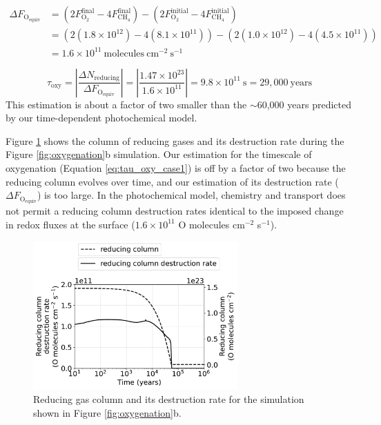 \begin{equation}
\begin{split}
\Delta F_\mathrm{O_{equiv}} &= (2 F_\mathrm{O_2}^\text{final} - 4 F_\mathrm{CH_4}^\text{final}) - (2 F_\mathrm{O_2}^\text{initial} - 4 F_\mathrm{CH_4}^\text{initial}) \\
&= (2(1.8\times10^{12}) - 4(8.1\times10^{11})) - (2(1.0\times10^{12}) - 4(4.5\times10^{11})) \\
&= 1.6 \times 10^{11} \:\mathrm{molecules}\:\mathrm{cm^{-2}}\:\mathrm{s^{-1}}
\end{split}
\end{equation}

\begin{equation} \label{eq:tau_oxy_case1}
    \tau_\text{oxy} = \left| \frac{\Delta N_\text{reducing}}{\Delta F_\mathrm{O_{equiv}}} \right| = \left|\frac{1.47 \times 10^{23}} {1.6 \times 10^{11}} \right| = 9.8 \times 10^{11} \: \text{s} = 29,000 \: \text{years}
\end{equation}
This estimation is about a factor of two smaller than the $\sim$60,000 years predicted by our time-dependent photochemical model. 

Figure \ref{fig:column_rate} shows the column of reducing gases and its destruction rate during the Figure \ref{fig:oxygenation}b simulation. Our estimation for the timescale of oxygenation (Equation \eqref{eq:tau_oxy_case1}) is off by a factor of two because the reducing column evolves over time, and our estimation of its destruction rate ($\Delta F_\mathrm{O_{equiv}}$) is too large. In the photochemical model, chemistry and transport does not permit a reducing column destruction rates identical to the imposed change in redox fluxes at the surface ($1.6 \times 10^{11}$ O molecules cm$^{-2}$ s$^{-1}$).

\begin{figure}
  \centering
  \includegraphics[width=0.7\textwidth]{tex/4goe/supplement/figures/Column_rates.pdf}
  \caption{Reducing gas column and its destruction rate for the simulation shown in Figure \ref{fig:oxygenation}b.}
  \label{fig:column_rate}
\end{figure}

